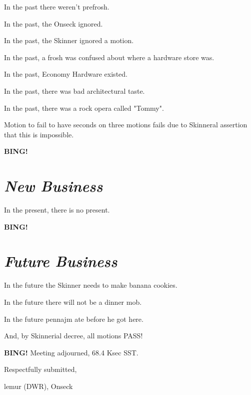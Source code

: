 \documentclass[10pt]{article}
\newcommand{\bing}{{\bf BING!} }
\newcommand{\goto}[1]{\bing \vskip 12pt \section*{{\em{#1}}}}
\newcommand{\onseck}{lemur (DWR), Onseck}
\begin{document}
In the past there weren't prefrosh.

In the past, the Onseck ignored.

In the past, the Skinner ignored a motion.

In the past, a frosh was confused about where a hardware
store was.

In the past, Economy Hardware existed.

In the past, there was bad architectural taste.

In the past, there was a rock opera called "Tommy".

Motion to fail to have seconds on three motions fails due to
Skinneral assertion that this is impossible.


\goto{New Business}

In the present, there is no present.

\goto{Future Business}

In the future the Skinner needs to make banana cookies.

In the future there will not be a dinner mob.

In the future pennajm ate before he got here.

And, by Skinnerial decree, all motions PASS!

\bing
\noindent
Meeting adjourned, 68.4 Ksec SST.

\vspace{18pt}

\centerline{Respectfully submitted,}
\centerline{\onseck}
\end{document}
